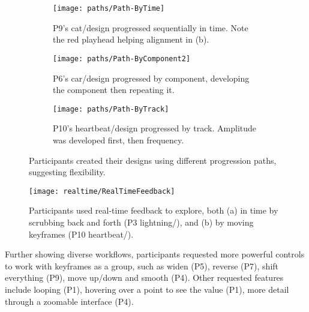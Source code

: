 \begin{figure}[Htb]
\centering
\begin{subfigure}{4.5in}
    \centering
    \texttt{[image: paths/Path-ByTime]}
    \caption{P9's cat/\none design progressed sequentially in time.
    Note the red playhead helping alignment in (b).
     }
    \label{fig:path:bytime}
\end{subfigure}

\begin{subfigure}{3.5in}
    \centering
    \texttt{[image: paths/Path-ByComponent2]}
    \caption{P6's car/\lo design progressed by component, developing the component then repeating it.}
    \label{fig:path:bycomponent}
\end{subfigure}

\begin{subfigure}{4.5in}
    \centering
    \texttt{[image: paths/Path-ByTrack]}
    \caption{P10's heartbeat/\vis design progressed by track. Amplitude was developed first, then frequency.
    }
    \label{fig:path:bytrack}
\end{subfigure}
\caption{Participants created their designs using different progression paths, suggesting flexibility.}
\label{fig:path}
\end{figure}
%
   \begin{figure}[Htb]
    \centering
    \texttt{[image: realtime/RealTimeFeedback]}
    \caption{Participants used real-time feedback to explore, both (a) in time by scrubbing back and forth (P3 lightning/\lo), and (b) by moving keyframes (P10 heartbeat/\vis).
        }
    \label{fig:realtimefeedback}
\end{figure}
    

    Further showing diverse workflows, participants requested more powerful controls to work with keyframes as a group, such as widen (P5), reverse (P7), shift everything (P9), move up/down and smooth (P4). %
    Other requested features include looping (P1), hovering over a point to see the value (P1), more detail through a zoomable interface (P4). 

